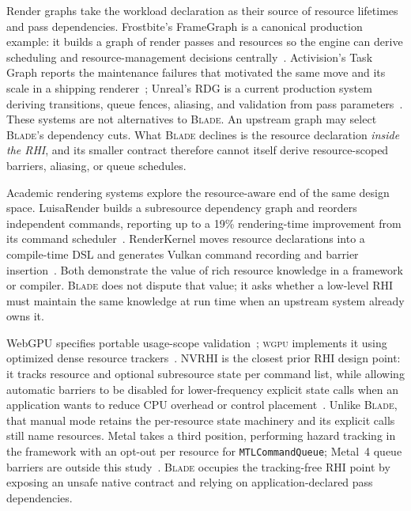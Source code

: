 \documentclass[10pt,twocolumn]{article}
\newcommand{\blade}{\textsc{Blade}}
\newcommand{\wgpu}{\textsc{wgpu}}
\begin{document}
Render graphs take the workload declaration as their source of resource
lifetimes and pass dependencies. Frostbite's FrameGraph is a canonical
production example: it builds a graph of render passes and resources so the
engine can derive scheduling and resource-management decisions
centrally~\cite{frostbite-framegraph}. Activision's Task Graph reports the
maintenance failures that motivated the same move and its scale in a shipping
renderer~\cite{activision-task-graph}; Unreal's RDG is a current production
system deriving transitions, queue fences, aliasing, and validation from pass
parameters~\cite{unreal-rdg}. These systems are not alternatives to \blade{}.
An upstream graph may select \blade's dependency cuts. What \blade{} declines
is the resource declaration \emph{inside the RHI}, and its smaller contract
therefore cannot itself derive resource-scoped barriers, aliasing, or queue
schedules.

Academic rendering systems explore the resource-aware end of the same design
space. LuisaRender builds a subresource dependency graph and reorders
independent commands, reporting up to a 19\% rendering-time improvement from
its command scheduler~\cite{luisa-render}. RenderKernel moves resource
declarations into a compile-time DSL and generates Vulkan command recording
and barrier insertion~\cite{renderkernel}. Both demonstrate the value of rich
resource knowledge in a framework or compiler. \blade{} does not dispute that
value; it asks whether a low-level RHI must maintain the same knowledge at run
time when an upstream system already owns it.

WebGPU specifies portable usage-scope validation~\cite{webgpu-spec}; \wgpu{}
implements it using optimized dense resource trackers~\cite{wgpu-trackers}.
NVRHI is the closest prior RHI design point: it tracks resource and optional
subresource state per command list, while allowing automatic barriers to be
disabled for lower-frequency explicit state calls when an application wants
to reduce CPU overhead or control placement~\cite{nvrhi-state-tracking}.
Unlike \blade{}, that manual mode retains the per-resource state machinery and
its explicit calls still name resources.
Metal takes a third position, performing hazard tracking in the framework with
an opt-out per resource for \texttt{MTLCommandQueue}; Metal~4 queue barriers
are outside this study~\cite{metal-hazard-tracking}. \blade{} occupies the
tracking-free RHI point by exposing an unsafe native contract and relying on
application-declared pass dependencies.
\end{document}

